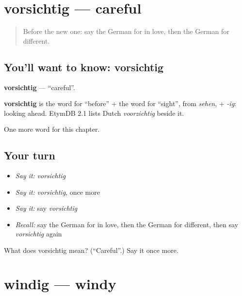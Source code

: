 \section[vorsichtig]{vorsichtig — careful}

\label{lesson:GE-C224-vorsichtig}



\begin{quote}
Before the new one: say the German for in love, then the German for different.
\end{quote}

\subsection*{You'll want to know: vorsichtig}
\textbf{vorsichtig} — \textquotedblleft{}careful\textquotedblright{}.

\begin{cousinweb}
\textbf{vorsichtig} is the word for \textquotedblleft{}before\textquotedblright{} + the word for \textquotedblleft{}sight\textquotedblright{}, from \emph{sehen}, + \emph{-ig}: looking ahead. EtymDB 2.1 lists Dutch \emph{voorzichtig} beside it.
\end{cousinweb}

\begin{grammarlens}[title={What you've built}]
One more word for this chapter.
\end{grammarlens}

\subsection*{Your turn}
\begin{itemize}
\raggedright
  \item \emph{Say it:} \emph{vorsichtig}
  \item \emph{Say it:} \emph{vorsichtig}, once more
  \item \emph{Say it:} say \emph{vorsichtig}
  \item \emph{Recall:} say the German for in love, then the German for different, then say \emph{vorsichtig} again
\end{itemize}

\begin{tcolorbox}[breakable,colback=teal!4,colframe=teal!35!black,title={Before you move on}]
What does vorsichtig mean? (\textquotedblleft{}Careful\textquotedblright{}.) Say it once more.
\end{tcolorbox}
\section[windig]{windig — windy}

